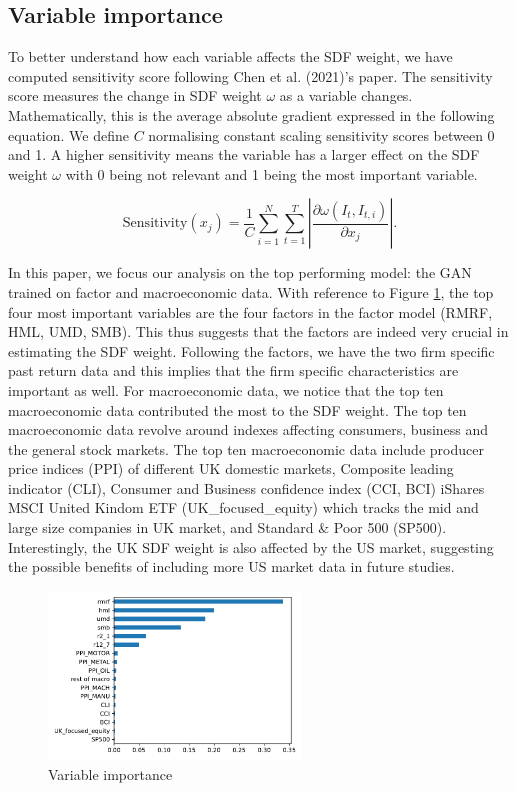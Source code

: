 \documentclass[12pt]{article}
\begin{document}
\newpage

\hypertarget{variable-importance}{%
\subsection{Variable importance}\label{variable-importance}}

To better understand how each variable affects the SDF
weight, we have computed sensitivity score following
Chen et al. (2021)'s paper. The sensitivity score measures the
change in SDF weight \(\omega\) as a variable changes. Mathematically, this
is the average absolute gradient expressed in the following
equation. We define \(C\) normalising constant scaling
sensitivity scores between 0 and 1. A higher
sensitivity means the variable has a larger effect on the
SDF weight \(\omega\) with 0 being not relevant and 1 being
the most important variable.

\[
\text{Sensitivity}(x_j) = \frac{1}{C} \sum_{i=1}^N \sum_{t=1}^T
    \left|  \frac{\partial \omega(I_t, I_{t, i})}{\partial x_j} \right|.
\]

In this paper, we focus our analysis on the top performing model: the GAN
trained on factor and macroeconomic data.
With reference to Figure \ref{fig:vi}, the top four most
important variables are the four factors in the factor
model (RMRF, HML, UMD, SMB). This thus suggests that the
factors are indeed very crucial in estimating the SDF weight.
Following the factors, we have the two firm
specific past return data and this implies that the firm specific
characteristics are important as well. For macroeconomic
data, we notice that the top ten macroeconomic data
contributed the most to the SDF weight. The top ten
macroeconomic data revolve around indexes affecting
consumers, business and the general stock markets. The top
ten macroeconomic data include producer price indices (PPI) of
different UK domestic markets, Composite leading indicator (CLI),
Consumer and Business confidence index (CCI, BCI)
iShares MSCI United Kindom ETF (UK\_focused\_equity) which
tracks the mid and large size companies in UK market,
and Standard \& Poor 500 (SP500).
Interestingly, the UK SDF weight is also affected by the US
market, suggesting the possible benefits of including more US
market data in future studies.

\begin{figure}
\centering
\includegraphics[width=0.6\textwidth,height=\textheight]{./src/vi}
\caption{\label{fig:vi} Variable importance}
\end{figure}
\end{document}
